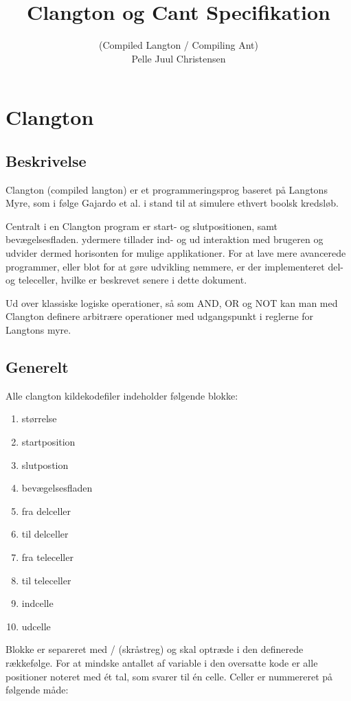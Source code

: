 \documentclass[11pt]{article}
\title{Clangton og Cant Specifikation}
\author{(Compiled Langton / Compiling Ant) \\ Pelle Juul Christensen}
\begin{document}
\maketitle

\tableofcontents

\section{Clangton}
\subsection{Beskrivelse}

Clangton (compiled langton) er et programmeringsprog baseret på Langtons Myre, som i følge Gajardo et al. i stand til at simulere ethvert boolsk kredsløb.

Centralt i en Clangton program er start- og slutpositionen, samt bevægelsesfladen. ydermere tillader ind- og ud interaktion med brugeren og udvider dermed horisonten for mulige applikationer. For at lave mere avancerede programmer, eller blot for at gøre udvikling nemmere, er der implementeret del- og teleceller, hvilke er beskrevet senere i dette dokument. 

Ud over klassiske logiske operationer, så som AND, OR og NOT kan man med Clangton definere arbitrære operationer med udgangspunkt i reglerne for Langtons myre.

\subsection{Generelt}
Alle clangton kildekodefiler indeholder følgende blokke:
\begin{enumerate}
	\item størrelse
	\item startposition
	\item slutpostion
	\item bevægelsesfladen
	\item fra delceller
	\item til delceller
	\item fra teleceller
	\item til teleceller
	\item indcelle
	\item udcelle
\end{enumerate}

Blokke er separeret med / (skråstreg) og skal optræde i den definerede rækkefølge. For at mindske antallet af variable i den oversatte kode er alle positioner noteret med ét tal, som svarer til én celle. Celler er nummereret på følgende måde:
\end{document}

